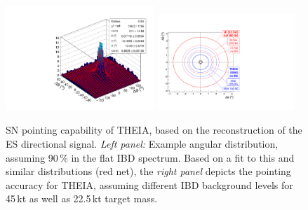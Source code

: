 \begin{figure}[h!]
\centering
\includegraphics[width=0.5\textwidth]{pics/sn_directionality_fit.pdf}
\hfill
\includegraphics[width=0.46\textwidth]{pics/sn_position_resolution.pdf}
\caption{SN pointing capability of THEIA, based on the reconstruction of the ES directional signal. {\it Left panel:} Example angular distribution, assuming 90\,\% in the flat IBD spectrum. Based on a fit to this and similar distributions (red net), the {\it right panel} depicts the pointing accuracy for THEIA, assuming different IBD background levels for 45\,kt as well as 22.5\,kt target mass.}
\label{fig:snpointing}
\end{figure} 
 
 




